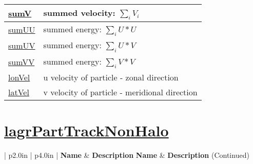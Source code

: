 {\begin{center}
\begin{longtable}{| p{2.0in} | p{4.0in} |}
    \hline
    \hyperref[subsec:var_sec_lagrPartTrackHalo_sumV]{sumV} & summed velocity: $\sum_i V_i$ \\
    \hline
    \hyperref[subsec:var_sec_lagrPartTrackHalo_sumUU]{sumUU} & summed energy: $\sum_i U*U$ \\
    \hline
    \hyperref[subsec:var_sec_lagrPartTrackHalo_sumUV]{sumUV} & summed energy: $\sum_i U*V$ \\
    \hline
    \hyperref[subsec:var_sec_lagrPartTrackHalo_sumVV]{sumVV} & summed energy: $\sum_i V*V$ \\
    \hline
    \hyperref[subsec:var_sec_lagrPartTrackHalo_lonVel]{lonVel} & u velocity of particle - zonal direction \\
    \hline
    \hyperref[subsec:var_sec_lagrPartTrackHalo_latVel]{latVel} & v velocity of particle - meridional direction \\
    \hline
\end{longtable}
\end{center}
}
\section[lagrPartTrackNonHalo]{\hyperref[sec:var_sec_lagrPartTrackNonHalo]{lagrPartTrackNonHalo}}
\label{sec:var_tab_lagrPartTrackNonHalo}
\vspace{0.5in}
{\small
\begin{center}
\begin{longtable}{| p{2.0in} | p{4.0in} |}
    \hline
    {\bf Name} & {\bf Description} \endfirsthead
    \hline 
    {\bf Name} & {\bf Description} (Continued) \endhead
    \hline
\end{longtable}
\end{center}
}
